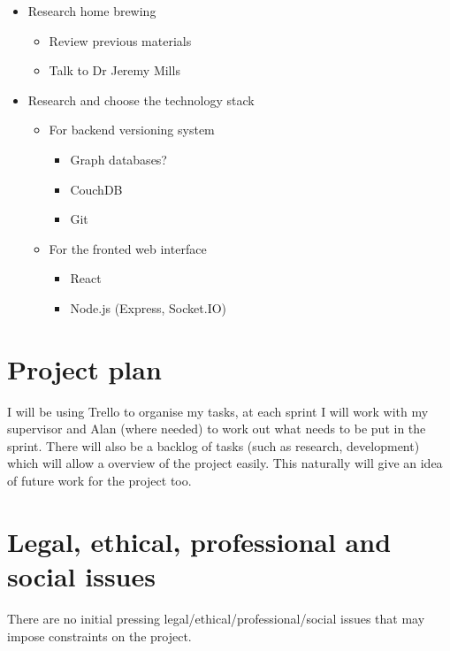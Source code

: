 \begin{itemize}
    \item Research home brewing
        \begin{itemize}
            \item Review previous materials
            \item Talk to Dr Jeremy Mills
        \end{itemize}
    \item Research and choose the technology stack
        \begin{itemize}
            \item For backend versioning system
            \begin{itemize}
                \item Graph databases?
                \item CouchDB
                \item Git
            \end{itemize}
        \end{itemize}
        \begin{itemize}
            \item For the fronted web interface
            \begin{itemize}
                \item React
                \item Node.js (Express, Socket.IO)
            \end{itemize}
        \end{itemize}
\end{itemize}

\section{Project plan}


I will be using Trello to organise my tasks, at each sprint I will work with my supervisor and Alan (where needed) to work out what needs to be put in the sprint. There will also be a backlog of tasks (such as research, development) which will allow a overview of the project easily. This naturally will give an idea of future work for the project too.

\section{Legal, ethical, professional and social issues}

There are no initial pressing legal/ethical/professional/social issues that may impose constraints on the project.

